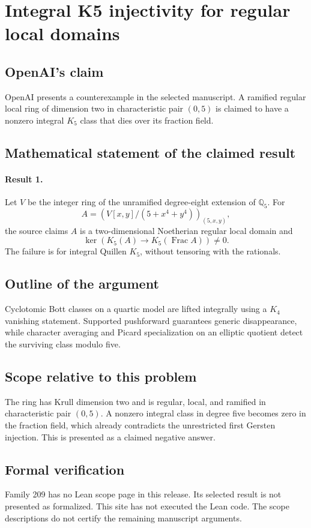 \documentclass[11pt]{article}
\begin{document}
\section*{Integral K5 injectivity for regular local domains}

\subsection{OpenAI's claim}
OpenAI presents a counterexample in the selected manuscript. A ramified regular local ring of dimension two in characteristic pair $(0,5)$ is claimed to have a nonzero integral $K_5$ class that dies over its fraction field.

\subsection{Mathematical statement of the claimed result}
\paragraph{Result 1.} Let \(V\) be the integer ring of the unramified degree-eight extension of \(\mathbb Q_5\). For
\[
 A=(V[x,y]/(5+x^4+y^4))_{(5,x,y)},
\]
the source claims \(A\) is a two-dimensional Noetherian regular local domain and
\[
 \ker(K_5(A)\to K_5(\operatorname{Frac}A))\ne0.
\]
The failure is for integral Quillen \(K_5\), without tensoring with the rationals.

\subsection{Outline of the argument}
Cyclotomic Bott classes on a quartic model are lifted integrally using a $K_4$ vanishing statement. Supported pushforward guarantees generic disappearance, while character averaging and Picard specialization on an elliptic quotient detect the surviving class modulo five.

\subsection{Scope relative to this problem}
The ring has Krull dimension two and is regular, local, and ramified in characteristic pair $(0,5)$. A nonzero integral class in degree five becomes zero in the fraction field, which already contradicts the unrestricted first Gersten injection. This is presented as a claimed negative answer.

\subsection{Formal verification}
Family 209 has no Lean scope page in this release. Its selected result is not presented as formalized. This site has not executed the Lean code. The scope descriptions do not certify the remaining manuscript arguments.
\end{document}
